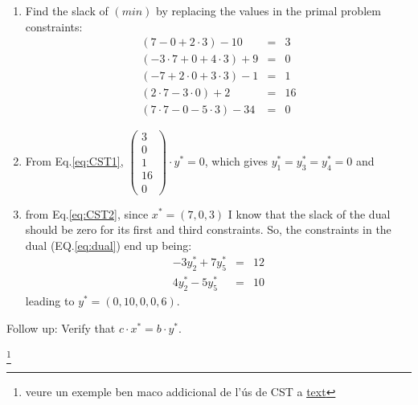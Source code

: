   \begin{enumerate}
    \item Find the slack of $(min)$ by replacing the values in the primal problem constraints:
    \[\begin{array}{rcl}
      (7-0+2\cdot 3)-10&=&3 \\
      (-3\cdot 7+0+4\cdot 3)+9&=&0 \\
      (-7+2\cdot 0+3\cdot 3)-1&=&1\\
      (2\cdot 7-3\cdot 0)+2&=&16\\
      (7\cdot 7-0-5\cdot 3)-34&=&0
    \end{array}\]
  \item From Eq.\ref{eq:CST1}, $\begin{pmatrix}3\\0\\1\\16\\0\end{pmatrix}\cdot y^*=0$, which gives $y^*_1=y^*_3=y^*_4=0$ and
  \item from Eq.\ref{eq:CST2}, since $x^*=(7,0,3)$ I know that the slack of the dual should be zero for its first and  third constraints. So, the constraints in the dual (EQ.\ref{eq:dual}) end up being:
  \[
  \begin{array}{rcl}
    -3y_2^*+7y_5^*&=&12\\
    4y_2^*-5y_5^*&=&10
  \end{array}\]
  leading to $y^*=(0,10,0,0,6)$.
\end{enumerate}
Follow up: Verify that $c\cdot x^*=b\cdot y^*$.


\footnote{veure un exemple ben maco addicional de l'ús de CST a \href{https://youtu.be/o1pznRt_-y0?si=TT3smkbBkT-ED1Sx&t=2086}{text} }


